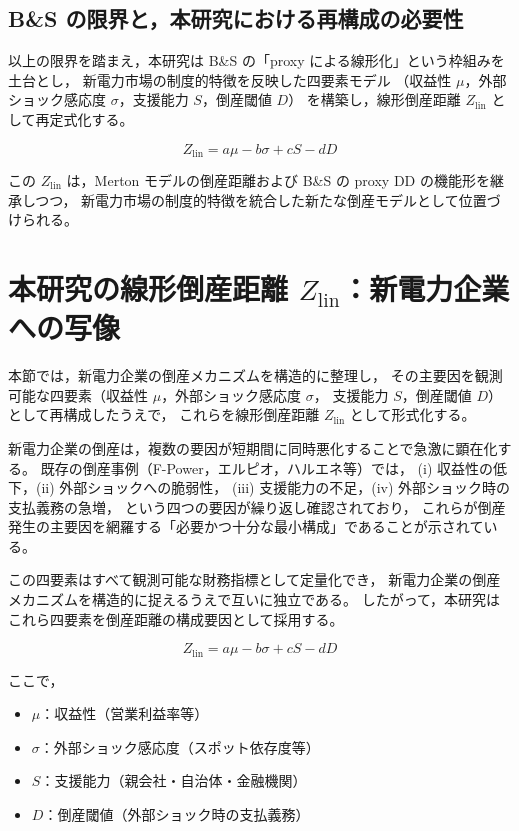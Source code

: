 \subsection{B\&S の限界と，本研究における再構成の必要性}

以上の限界を踏まえ，本研究は B\&S の「proxy による線形化」という枠組みを土台とし，
新電力市場の制度的特徴を反映した四要素モデル
（収益性 $\mu$，外部ショック感応度 $\sigma$，支援能力 $S$，倒産閾値 $D$）
を構築し，線形倒産距離 $Z_{\text{lin}}$ として再定式化する。



\[
Z_{\text{lin}} = a\mu - b\sigma + cS - dD
\]



この $Z_{\text{lin}}$ は，Merton モデルの倒産距離および B\&S の proxy DD の機能形を継承しつつ，
新電力市場の制度的特徴を統合した新たな倒産モデルとして位置づけられる。


\section{本研究の線形倒産距離 $Z_{\text{lin}}$：新電力企業への写像}

本節では，新電力企業の倒産メカニズムを構造的に整理し，
その主要因を観測可能な四要素（収益性 $\mu$，外部ショック感応度 $\sigma$，
支援能力 $S$，倒産閾値 $D$）として再構成したうえで，
これらを線形倒産距離 $Z_{\text{lin}}$ として形式化する。

新電力企業の倒産は，複数の要因が短期間に同時悪化することで急激に顕在化する。
既存の倒産事例（F-Power，エルピオ，ハルエネ等）では，
(i) 収益性の低下，(ii) 外部ショックへの脆弱性，
(iii) 支援能力の不足，(iv) 外部ショック時の支払義務の急増，
という四つの要因が繰り返し確認されており，
これらが倒産発生の主要因を網羅する「必要かつ十分な最小構成」であることが示されている。

この四要素はすべて観測可能な財務指標として定量化でき，
新電力企業の倒産メカニズムを構造的に捉えるうえで互いに独立である。
したがって，本研究はこれら四要素を倒産距離の構成要因として採用する。



\[
Z_{\text{lin}} = a\mu - b\sigma + cS - dD
\]



ここで，
\begin{itemize}
    \item $\mu$：収益性（営業利益率等）
    \item $\sigma$：外部ショック感応度（スポット依存度等）
    \item $S$：支援能力（親会社・自治体・金融機関）
    \item $D$：倒産閾値（外部ショック時の支払義務）
\end{itemize}

